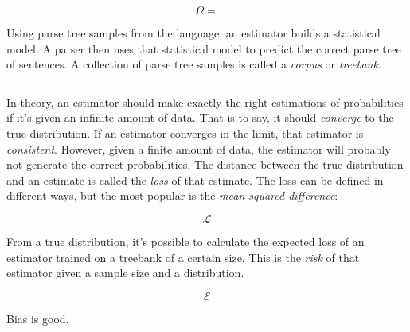 $$\Omega = $$

Using parse tree samples from the language, an estimator builds a statistical model. A parser then uses that statistical model to predict the correct parse tree of sentences.
A collection of parse tree samples is called a \emph{corpus} or \emph{treebank}.

$$  $$

In theory, an estimator should make exactly the right estimations of probabilities if it's given an infinite amount of data. That is to say, it should \emph{converge} to the true distribution. If an estimator converges in the limit, that estimator is \emph{consistent}.
However, given a finite amount of data, the estimator will probably not generate the correct probabilities. The distance between the true distribution and an estimate is called the \emph{loss} of that estimate. The loss can be defined in different ways, but the most popular is the \emph{mean squared difference}:

$$ \mathcal{L} $$

From a true distribution, it's possible to calculate the expected loss of an estimator trained on a treebank of a certain size. This is the \emph{risk} of that estimator given a sample size and a distribution.

$$ \mathcal{E} $$










Bias is good.